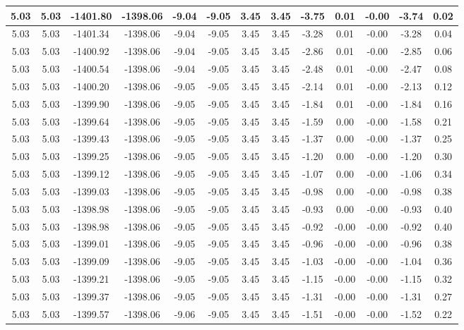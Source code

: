 \begin{table}[htbp]
\begin{adjustbox}{angle=90}
\begin{tabular}{|c|c|c|c|c|c|c|c|c|c|c|c|c|}
 5.03 & 5.03 & -1401.80 & -1398.06 & -9.04 & -9.05 & 3.45 & 3.45 & -3.75 & 0.01 & -0.00 & -3.74 & 0.02\\ \hline
 5.03 & 5.03 & -1401.34 & -1398.06 & -9.04 & -9.05 & 3.45 & 3.45 & -3.28 & 0.01 & -0.00 & -3.28 & 0.04\\ \hline
 5.03 & 5.03 & -1400.92 & -1398.06 & -9.04 & -9.05 & 3.45 & 3.45 & -2.86 & 0.01 & -0.00 & -2.85 & 0.06\\ \hline
 5.03 & 5.03 & -1400.54 & -1398.06 & -9.04 & -9.05 & 3.45 & 3.45 & -2.48 & 0.01 & -0.00 & -2.47 & 0.08\\ \hline
 5.03 & 5.03 & -1400.20 & -1398.06 & -9.05 & -9.05 & 3.45 & 3.45 & -2.14 & 0.01 & -0.00 & -2.13 & 0.12\\ \hline
 5.03 & 5.03 & -1399.90 & -1398.06 & -9.05 & -9.05 & 3.45 & 3.45 & -1.84 & 0.01 & -0.00 & -1.84 & 0.16\\ \hline
 5.03 & 5.03 & -1399.64 & -1398.06 & -9.05 & -9.05 & 3.45 & 3.45 & -1.59 & 0.00 & -0.00 & -1.58 & 0.21\\ \hline
 5.03 & 5.03 & -1399.43 & -1398.06 & -9.05 & -9.05 & 3.45 & 3.45 & -1.37 & 0.00 & -0.00 & -1.37 & 0.25\\ \hline
 5.03 & 5.03 & -1399.25 & -1398.06 & -9.05 & -9.05 & 3.45 & 3.45 & -1.20 & 0.00 & -0.00 & -1.20 & 0.30\\ \hline
 5.03 & 5.03 & -1399.12 & -1398.06 & -9.05 & -9.05 & 3.45 & 3.45 & -1.07 & 0.00 & -0.00 & -1.06 & 0.34\\ \hline
 5.03 & 5.03 & -1399.03 & -1398.06 & -9.05 & -9.05 & 3.45 & 3.45 & -0.98 & 0.00 & -0.00 & -0.98 & 0.38\\ \hline
 5.03 & 5.03 & -1398.98 & -1398.06 & -9.05 & -9.05 & 3.45 & 3.45 & -0.93 & 0.00 & -0.00 & -0.93 & 0.40\\ \hline
 5.03 & 5.03 & -1398.98 & -1398.06 & -9.05 & -9.05 & 3.45 & 3.45 & -0.92 & -0.00 & -0.00 & -0.92 & 0.40\\ \hline
 5.03 & 5.03 & -1399.01 & -1398.06 & -9.05 & -9.05 & 3.45 & 3.45 & -0.96 & -0.00 & -0.00 & -0.96 & 0.38\\ \hline
 5.03 & 5.03 & -1399.09 & -1398.06 & -9.05 & -9.05 & 3.45 & 3.45 & -1.03 & -0.00 & -0.00 & -1.04 & 0.36\\ \hline
 5.03 & 5.03 & -1399.21 & -1398.06 & -9.05 & -9.05 & 3.45 & 3.45 & -1.15 & -0.00 & -0.00 & -1.15 & 0.32\\ \hline
 5.03 & 5.03 & -1399.37 & -1398.06 & -9.05 & -9.05 & 3.45 & 3.45 & -1.31 & -0.00 & -0.00 & -1.31 & 0.27\\ \hline
 5.03 & 5.03 & -1399.57 & -1398.06 & -9.06 & -9.05 & 3.45 & 3.45 & -1.51 & -0.00 & -0.00 & -1.52 & 0.22\\ \hline

\end{tabular}
\end{adjustbox}
\end{table}
